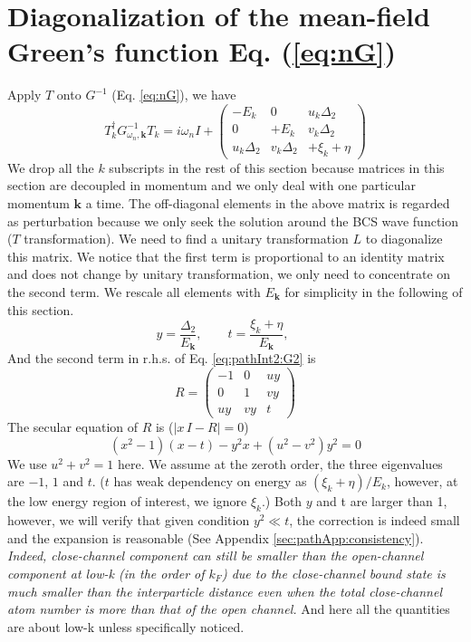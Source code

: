 \documentclass[reprint,pra]{revtex4-1}
\newcommand{\vk}{\ensuremath{\mathbf{k}}}
\providecommand{\abs}[1]{\ensuremath{\left\lvert{#1}\right\rvert}}
\newcommand{\mtrx}[1]{\ensuremath{\begin{pmatrix}#1\end{pmatrix}}}
\newcommand{\dg}{\ensuremath{\dagger}}
\begin{document}
\section{Diagonalization of  the mean-field Green's function Eq. (\ref{eq:nG})\label{sec:diagonalize}}
 Apply $T$ onto $G^{-1}$ (Eq. \ref{eq:nG}), we have 
\begin{equation}\label{eq:pathInt2:G2}
T_k^{\dg}G_{\omega_{n},\vk}^{-1}T_k=i\omega_nI+\mtrx{-E_k&0&u_k\Delta_2\\0&+E_k&v_k\Delta_2\\u_k\Delta_2&v_k\Delta_2&+\xi_k+\eta}
\end{equation}
We drop all the $k$ subscripts in the rest of this section because matrices in this section are decoupled in momentum and we only deal with one particular momentum $\vk$ a time. The off-diagonal elements in the above matrix is regarded as perturbation because  we  only seek the solution around the BCS wave function ($T$ transformation). 
We need to find a unitary transformation $L$ to diagonalize this  matrix.
 We notice that the first term is proportional to an identity matrix and does not change by unitary transformation, we only need to concentrate on the second term.  We rescale all elements with $E_{\vk}$ for simplicity in the following of this section. 
\begin{equation*}
y=\frac{\Delta_2}{E_{\vk}},\qquad
 t=\frac{\xi_k+\eta}{E_{\vk}},\qquad
\end{equation*}
 And the second term in r.h.s. of Eq. \ref{eq:pathInt2:G2} is 
\begin{equation*}
R=
\begin{pmatrix}
-1&0&uy\\
0&1&vy\\
uy&vy&t
\end{pmatrix}
\end{equation*}
The secular equation of $R$ is ($\abs{x\,I-R}=0$)
\begin{equation}\label{eq:pahtApp:secular}
(x^{2}-1)(x-t)-y^{2}x+(u^{2}-v^{2})y^{2}=0
\end{equation}
We use $u^{2}+v^{2}=1$ here.  We  assume at the zeroth order, the three eigenvalues are $-1$, $1$ and $t$.  ($t$ has weak dependency on energy as $(\xi_{k}+\eta)/E_{k}$, however, at the low energy region of interest, we ignore $\xi_{k}$.) Both $y$ and t are larger than 1, however, we will verify that given condition $y^{2}\ll{t}$, the correction is indeed small and the expansion is reasonable (See Appendix \ref{sec:pathApp:consistency}).  \emph{Indeed,  close-channel component can still be smaller than the open-channel component at low-k (in the order of $k_{F}$)  due to the close-channel bound state is much smaller than the interparticle distance even when the total close-channel atom number  is more than that of the open channel. }  And here all the quantities are about low-k unless specifically noticed.
\end{document}
